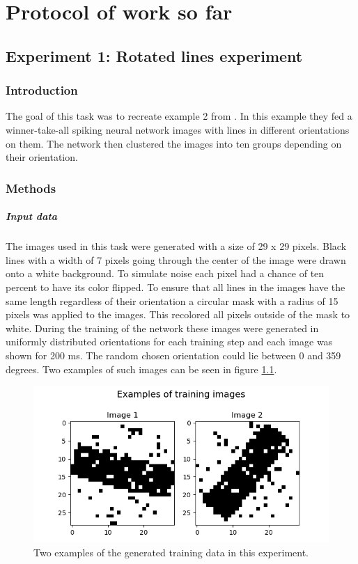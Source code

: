 \chapter{Protocol of work so far}
\section{Experiment 1: Rotated lines experiment}

\subsection{Introduction}
The goal of this task was to recreate example 2 from \citet{nessler}. In this example they fed a winner-take-all spiking neural network images with lines in different orientations on them. The network then clustered the images into ten groups depending on their orientation.

\subsection{Methods}
\paragraph{Input data}
The images used in this task were generated with a size of 29 x 29 pixels. Black lines with a width of 7 pixels going through the center of the image were drawn onto a white background. To simulate noise each pixel had a chance of ten percent to have its color flipped. To ensure that all lines in the images have the same length regardless of their orientation a circular mask with a radius of 15 pixels was applied to the images. This recolored all pixels outside of the mask to white. During the training of the network these images were generated in uniformly distributed orientations for each training step and each image was shown for 200 ms. The random chosen orientation could lie between 0 and 359 degrees.  Two examples of such images can be seen in figure \ref{fig:angleImages}.

\begin{figure}
  \includegraphics[width=\linewidth]{figures/angleNetwork/trainingImages.png}
  \caption{Two examples of the generated training data in this experiment.}
  \label{fig:angleImages}
\end{figure}

